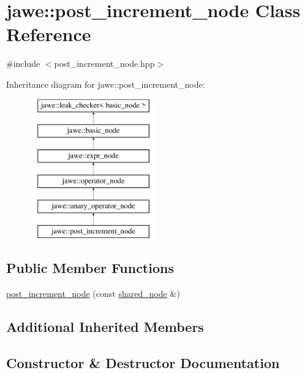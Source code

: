 \hypertarget{classjawe_1_1post__increment__node}{}\section{jawe\+:\+:post\+\_\+increment\+\_\+node Class Reference}
\label{classjawe_1_1post__increment__node}


{\ttfamily \#include $<$post\+\_\+increment\+\_\+node.\+hpp$>$}

Inheritance diagram for jawe\+:\+:post\+\_\+increment\+\_\+node\+:\begin{figure}[H]
\begin{center}
\leavevmode
\includegraphics[height=6.000000cm]{classjawe_1_1post__increment__node}
\end{center}
\end{figure}
\subsection*{Public Member Functions}
\begin{DoxyCompactItemize}
\item 
\hyperlink{classjawe_1_1post__increment__node_aba5ebe84c48612cd2dc3d251b981fcfe}{post\+\_\+increment\+\_\+node} (const \hyperlink{namespacejawe_a3f307481d921b6cbb50cc8511fc2b544}{shared\+\_\+node} \&)
\end{DoxyCompactItemize}
\subsection*{Additional Inherited Members}


\subsection{Constructor \& Destructor Documentation}
\mbox{\label{classjawe_1_1post__increment__node_aba5ebe84c48612cd2dc3d251b981fcfe}} 

